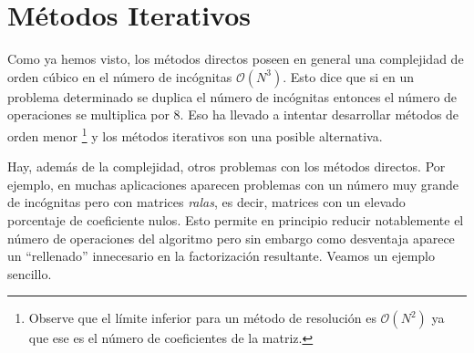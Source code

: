 \chapter{Métodos Iterativos}
Como ya hemos visto, los métodos directos poseen en general una complejidad de orden cúbico en el número de incógnitas $\mathcal{O}(N^3)$. Esto dice que si en un problema determinado se duplica el número de incógnitas entonces el número de operaciones se multiplica por 8. Eso ha llevado a intentar desarrollar métodos de orden menor \footnote{Observe que el límite inferior para un método de resolución  es $\mathcal{O}(N^2)$ ya que ese es el número de coeficientes de la matriz.} y los métodos iterativos son una posible alternativa.

Hay, además de la complejidad,  otros problemas con los métodos directos. Por ejemplo, en muchas aplicaciones aparecen problemas con un número muy grande de incógnitas pero con matrices \emph{ralas}, es decir, matrices con un elevado porcentaje de coeficiente nulos. Esto permite en principio reducir notablemente el número de operaciones del algoritmo pero sin embargo como desventaja aparece un ``rellenado'' innecesario en la factorización resultante. Veamos un ejemplo sencillo.

